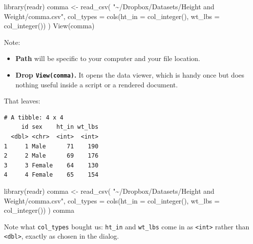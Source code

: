 \documentclass[
  12pt,
  a4paper,
]{scrbook}
\newenvironment{Shaded}{\begin{snugshade}}{\end{snugshade}}
\newcommand{\AttributeTok}[1]{\textcolor[rgb]{0.40,0.45,0.13}{#1}}
\newcommand{\FunctionTok}[1]{\textcolor[rgb]{0.28,0.35,0.67}{#1}}
\newcommand{\NormalTok}[1]{\textcolor[rgb]{0.00,0.23,0.31}{#1}}
\newcommand{\OtherTok}[1]{\textcolor[rgb]{0.00,0.23,0.31}{#1}}
\newcommand{\StringTok}[1]{\textcolor[rgb]{0.13,0.47,0.30}{#1}}
\providecommand{\tightlist}{%
  \setlength{\itemsep}{0pt}\setlength{\parskip}{0pt}}
\renewcommand{\tightlist}{\setlength{\itemsep}{0.5\baselineskip}\setlength{\parskip}{0.2\baselineskip}}
\theoremstyle{plain}
\theoremstyle{definition}
\theoremstyle{remark}
\begin{document}
\begin{Shaded}
\begin{Highlighting}[]
\FunctionTok{library}\NormalTok{(readr)}
\NormalTok{comma }\OtherTok{\textless{}{-}} \FunctionTok{read\_csv}\NormalTok{(}
    \StringTok{"\textasciitilde{}/Dropbox/Datasets/Height and Weight/comma.csv"}\NormalTok{,}
    \AttributeTok{col\_types =} \FunctionTok{cols}\NormalTok{(}\AttributeTok{ht\_in =} \FunctionTok{col\_integer}\NormalTok{(),}
                     \AttributeTok{wt\_lbs =} \FunctionTok{col\_integer}\NormalTok{())}
\NormalTok{    )}
\FunctionTok{View}\NormalTok{(comma)}
\end{Highlighting}
\end{Shaded}

Note:

\begin{itemize}
\tightlist
\item
  \textbf{Path} will be specific to your computer and your file
  location.
\item
  \textbf{Drop \texttt{View(comma)}.} It opens the data viewer, which is
  handy once but does nothing useful inside a script or a rendered
  document.
\end{itemize}

That leaves:

\begin{verbatim}
# A tibble: 4 x 4
     id sex    ht_in wt_lbs
  <dbl> <chr>  <int>  <int>
1     1 Male      71    190
2     2 Male      69    176
3     3 Female    64    130
4     4 Female    65    154
\end{verbatim}

\begin{Shaded}
\begin{Highlighting}[]
\FunctionTok{library}\NormalTok{(readr)}
\NormalTok{comma }\OtherTok{\textless{}{-}} \FunctionTok{read\_csv}\NormalTok{(}
    \StringTok{"\textasciitilde{}/Dropbox/Datasets/Height and Weight/comma.csv"}\NormalTok{,}
    \AttributeTok{col\_types =} \FunctionTok{cols}\NormalTok{(}\AttributeTok{ht\_in =} \FunctionTok{col\_integer}\NormalTok{(),}
                     \AttributeTok{wt\_lbs =} \FunctionTok{col\_integer}\NormalTok{())}
\NormalTok{    )}
\NormalTok{comma}
\end{Highlighting}
\end{Shaded}

Note what \texttt{col\_types} bought us: \texttt{ht\_in} and
\texttt{wt\_lbs} come in as \texttt{\textless{}int\textgreater{}} rather
than \texttt{\textless{}dbl\textgreater{}}, exactly as chosen in the
dialog.
\end{document}
